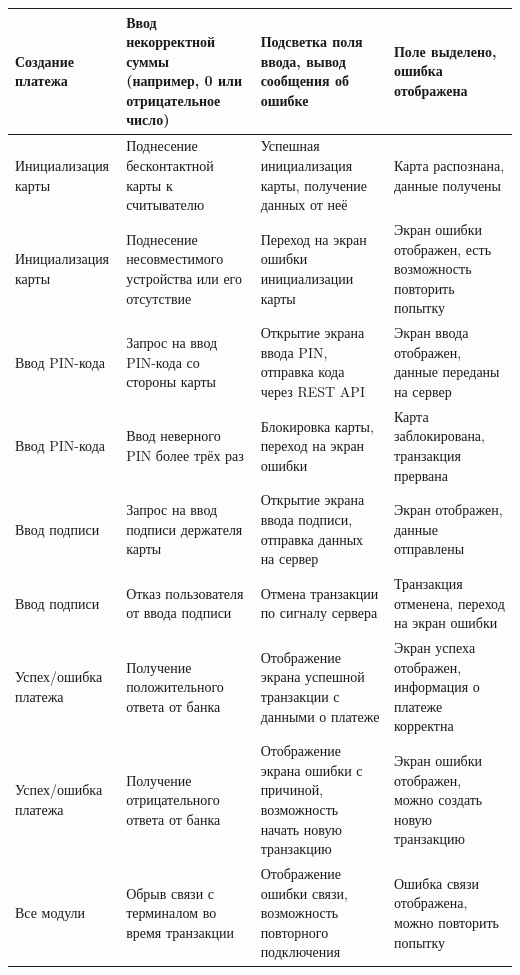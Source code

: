\begin{longtable}[l]{| P{0.18\textwidth} | P{0.2\textwidth} | P{0.26\textwidth} | P{0.26\textwidth}|}
    Создание платежа &
    Ввод некорректной суммы (например, 0 или отрицательное число) &
    Подсветка поля ввода, вывод сообщения об ошибке &
    Поле выделено, ошибка отображена \\
    \hline

    Инициализация карты &
    Поднесение бесконтактной карты к считывателю &
    Успешная инициализация карты, получение данных от неё &
    Карта распознана, данные получены \\
    \hline

    Инициализация карты &
    Поднесение несовместимого устройства или его отсутствие &
    Переход на экран ошибки инициализации карты &
    Экран ошибки отображен, есть возможность повторить попытку \\
    \hline

    Ввод PIN-кода &
    Запрос на ввод PIN-кода со стороны карты &
    Открытие экрана ввода PIN, отправка кода через REST API &
    Экран ввода отображен, данные переданы на сервер \\
    \hline

    Ввод PIN-кода &
    Ввод неверного PIN более трёх раз &
    Блокировка карты, переход на экран ошибки &
    Карта заблокирована, транзакция прервана \\
    \hline

    Ввод подписи &
    Запрос на ввод подписи держателя карты &
    Открытие экрана ввода подписи, отправка данных на сервер &
    Экран отображен, данные отправлены \\
    \hline

    Ввод подписи &
    Отказ пользователя от ввода подписи &
    Отмена транзакции по сигналу сервера &
    Транзакция отменена, переход на экран ошибки \\
    \hline

    Успех/ошибка платежа &
    Получение положительного ответа от банка &
    Отображение экрана успешной транзакции с данными о платеже &
    Экран успеха отображен, информация о платеже корректна \\
    \hline

    Успех/ошибка платежа &
    Получение отрицательного ответа от банка &
    Отображение экрана ошибки с причиной, возможность начать новую транзакцию &
    Экран ошибки отображен, можно создать новую транзакцию \\
    \hline

    Все модули &
    Обрыв связи с терминалом во время транзакции &
    Отображение ошибки связи, возможность повторного подключения &
    Ошибка связи отображена, можно повторить попытку \\
    \hline
\end{longtable}


